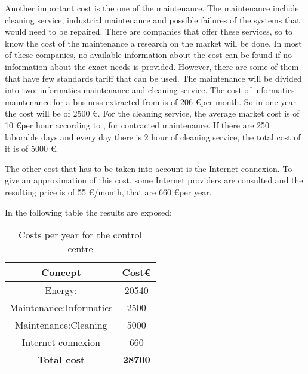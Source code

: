 Another important cost is the one of the maintenance. The maintenance include cleaning service, industrial maintenance and possible failures of the systems that would need to be repaired. There are companies that offer these services, so to know the cost of the maintenance a research on the market will be done. In most of these companies, no available information about the cost can be found if no information about the exact needs is provided. However, there are some of them that have few standards tariff that can be used. The maintenance will be divided into two: informatics maintenance and cleaning service. The cost of informatics maintenance for a business extracted from \cite{inf} is of 206 \euro per month. So in one year the cost will be of 2500 \euro. For the cleaning service, the average market cost is of 10 \euro per hour according to \cite{clean}, for contracted maintenance. If there are 250 laborable days and every day there is 2 hour of cleaning service, the total cost of it is of 5000 \euro.

The other cost that has to be taken into account is the Internet connexion. To give an approximation of this cost, some Internet providers are consulted and the resulting price is of 55 \euro /month, that are 660 \euro per year.

In the following table the results are exposed:
\begin{table}[H]
\begin{center}
\begin{tabular}{|c|c|}
\hline
\textbf{Concept}&\textbf{Cost\euro}\\
\hline
Energy:&20540\\
\hline
Maintenance:Informatics&2500\\
\hline
Maintenance:Cleaning&5000\\
\hline
Internet connexion&660\\
\hline
\textbf{Total cost}&\textbf{28700}\\
\hline
\end{tabular}
\caption{Costs per year for the control centre}
\end{center}
\end{table}

